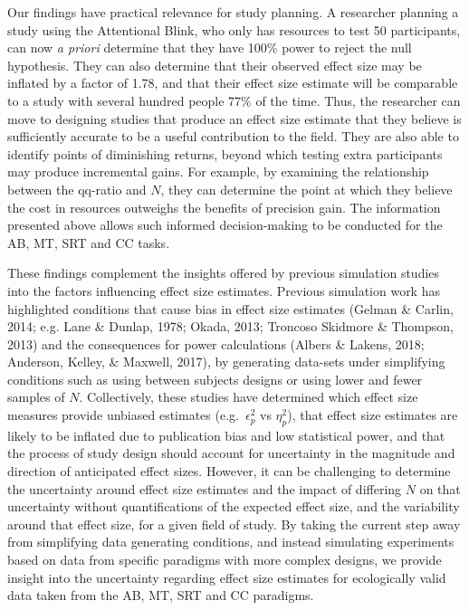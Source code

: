 \documentclass[
  man]{apa6}
\begin{document}
Our findings have practical relevance for study planning. A researcher planning a study using the Attentional Blink, who only has resources to test 50 participants, can now \emph{a priori} determine that they have 100\% power to reject the null hypothesis. They can also determine that their observed effect size may be inflated by a factor of 1.78, and that their effect size estimate will be comparable to a study with several hundred people 77\% of the time. Thus, the researcher can move to designing studies that produce an effect size estimate that they believe is sufficiently accurate to be a useful contribution to the field. They are also able to identify points of diminishing returns, beyond which testing extra participants may produce incremental gains. For example, by examining the relationship between the qq-ratio and \(N\), they can determine the point at which they believe the cost in resources outweighs the benefits of precision gain. The information presented above allows such informed decision-making to be conducted for the AB, MT, SRT and CC tasks.

These findings complement the insights offered by previous simulation studies into the factors influencing effect size estimates. Previous simulation work has highlighted conditions that cause bias in effect size estimates (Gelman \& Carlin, 2014; e.g. Lane \& Dunlap, 1978; Okada, 2013; Troncoso Skidmore \& Thompson, 2013) and the consequences for power calculations (Albers \& Lakens, 2018; Anderson, Kelley, \& Maxwell, 2017), by generating data-sets under simplifying conditions such as using between subjects designs or using lower and fewer samples of \(N\). Collectively, these studies have determined which effect size measures provide unbiased estimates (e.g.~\(\epsilon_{p}^2\) vs \(\eta_{p}^2\)), that effect size estimates are likely to be inflated due to publication bias and low statistical power, and that the process of study design should account for uncertainty in the magnitude and direction of anticipated effect sizes. However, it can be challenging to determine the uncertainty around effect size estimates and the impact of differing \(N\) on that uncertainty without quantifications of the expected effect size, and the variability around that effect size, for a given field of study. By taking the current step away from simplifying data generating conditions, and instead simulating experiments based on data from specific paradigms with more complex designs, we provide insight into the uncertainty regarding effect size estimates for ecologically valid data taken from the AB, MT, SRT and CC paradigms.
\end{document}
